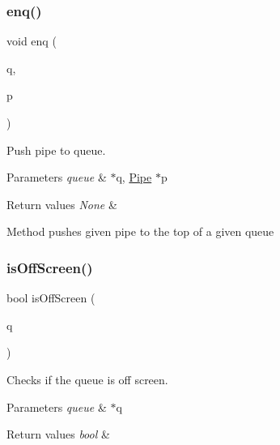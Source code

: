 \subsubsection{\texorpdfstring{enq()}{enq()}}
{\footnotesize\ttfamily void enq (\begin{DoxyParamCaption}\item[{\hyperlink{structqueue}{queue} $\ast$}]{q,  }\item[{\hyperlink{struct_pipe}{Pipe} $\ast$}]{p }\end{DoxyParamCaption})}



Push pipe to queue. 


\begin{DoxyParams}{Parameters}
{\em queue} & $\ast$q, \hyperlink{struct_pipe}{Pipe} $\ast$p \\
\hline
\end{DoxyParams}

\begin{DoxyRetVals}{Return values}
{\em None} & \\
\hline
\end{DoxyRetVals}
Method pushes given pipe to the top of a given queue \mbox{\label{group___queue___structure_ga9156a87b52e80132d4458a46fdfa0083}} 
\subsubsection{\texorpdfstring{is\+Off\+Screen()}{isOffScreen()}}
{\footnotesize\ttfamily bool is\+Off\+Screen (\begin{DoxyParamCaption}\item[{\hyperlink{structqueue}{queue} $\ast$}]{q }\end{DoxyParamCaption})}



Checks if the queue is off screen. 


\begin{DoxyParams}{Parameters}
{\em queue} & $\ast$q \\
\hline
\end{DoxyParams}

\begin{DoxyRetVals}{Return values}
{\em bool} & \\
\hline
\end{DoxyRetVals}
\mbox{\label{group___queue___structure_gae93a1da4d92342fc6237dcfaf4d034a2}} 
